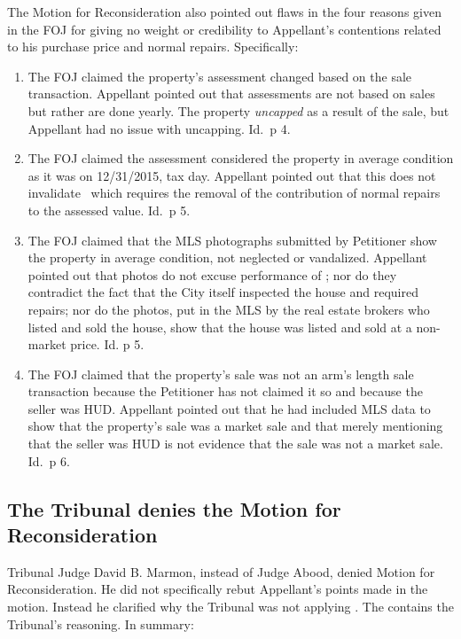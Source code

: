 \documentclass[12pt,\documentclassflag]{michiganCourtOfAppealsBrief}
\begin{document}
The Motion for Reconsideration also pointed out flaws in the four reasons given in the FOJ for giving no weight or credibility to Appellant's contentions related to his purchase price and normal repairs. Specifically:

\begin{enumerate}
\item The FOJ claimed the property's assessment changed based on the sale transaction. Appellant pointed out that assessments are not based on sales but rather are done yearly. The property \emph{uncapped} as a result of the sale, but Appellant had no issue with uncapping. Id.\ p 4.

\item The FOJ claimed the assessment considered the property in average condition as it was on 12/31/2015, tax day. Appellant pointed out that this does not invalidate \mathieuGast\ which requires the removal of the contribution of normal repairs to the assessed value. Id.\ p 5. 

\item The FOJ claimed that the MLS photographs submitted by Petitioner show the property in average condition, not neglected or vandalized. Appellant pointed out that photos do not excuse performance of \mathieuGast; nor do they contradict the fact that the City itself inspected the house and required repairs; nor do the photos, put in the MLS by the real estate brokers who listed and sold the house, show that the house was listed and sold at a non-market price. Id. p 5.
  
\item The FOJ claimed that the property's sale was not an arm's length sale transaction because the Petitioner has not claimed it so and because the seller was HUD. Appellant pointed out that he had included MLS data to show that the property's sale was a market sale and that merely mentioning that the seller was HUD is not evidence that the sale was not a market sale. Id.\ p 6.
\end{enumerate}

\subsection{The Tribunal denies the Motion for Reconsideration}

Tribunal Judge David B. Marmon, instead of Judge Abood, denied Motion for Reconsideration. He did not specifically rebut Appellant's points made in the motion. Instead he clarified why the Tribunal was not applying \mathieuGast. The \reconsiderationDenied[2] contains the Tribunal's reasoning. In summary:
\end{document}
